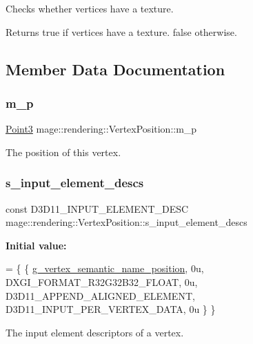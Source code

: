 Checks whether vertices have a texture.

\begin{DoxyReturn}{Returns}
{\ttfamily true} if vertices have a texture. {\ttfamily false} otherwise. 
\end{DoxyReturn}


\subsection{Member Data Documentation}
\mbox{\label{structmage_1_1rendering_1_1_vertex_position_a49602fa786c64fb0fca47a0a0992f779}} 
\subsubsection{\texorpdfstring{m\+\_\+p}{m\_p}}
{\footnotesize\ttfamily \mbox{\hyperlink{structmage_1_1_point3}{Point3}} mage\+::rendering\+::\+Vertex\+Position\+::m\+\_\+p}

The position of this vertex. \mbox{\label{structmage_1_1rendering_1_1_vertex_position_a669150e1acd6ed132eec465745ddb201}} 
\subsubsection{\texorpdfstring{s\+\_\+input\+\_\+element\+\_\+descs}{s\_input\_element\_descs}}
{\footnotesize\ttfamily const D3\+D11\+\_\+\+I\+N\+P\+U\+T\+\_\+\+E\+L\+E\+M\+E\+N\+T\+\_\+\+D\+E\+SC mage\+::rendering\+::\+Vertex\+Position\+::s\+\_\+input\+\_\+element\+\_\+descs\hspace{0.3cm}{\ttfamily [static]}}

{\bfseries Initial value\+:}
\begin{DoxyCode}
= \{
        \{ \mbox{\hyperlink{namespacemage_1_1rendering_1_1anonymous__namespace_02vertex_8cpp_03_a6e875b92e4de38b14e8dc404df41a5ad}{g\_vertex\_semantic\_name\_position}}, 0u, DXGI\_FORMAT\_R32G32B32\_FLOAT, 
         0u, D3D11\_APPEND\_ALIGNED\_ELEMENT, D3D11\_INPUT\_PER\_VERTEX\_DATA, 0u \}
    \}
\end{DoxyCode}
The input element descriptors of a vertex. 
